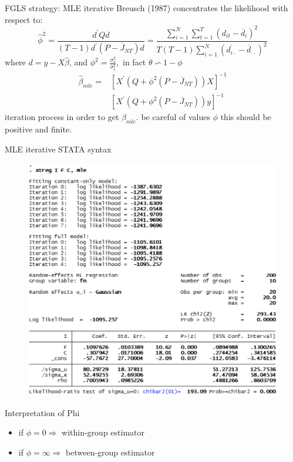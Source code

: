 \begin{frame}{FGLS strategy: MLE iterative}	
	Breusch (1987) concentrates the likelihood with respect to:%
			$$\widehat{\phi }^{2}=\frac{d^{\prime }Qd}{\left( T-1\right) d^{\prime }\left(
				P-\overline{J}_{NT}\right) d}=\frac{\sum_{i=1}^{N}\sum_{t=1}^{T}\left(
				d_{it}-\overline{d}_{i}\right) ^{2}}{T\left( T-1\right) \sum_{i=1}^{N}\left( 
				\overline{d_{i\cdot }}-\overline{d}_{\cdot \cdot }\right) ^{2}}$$
	where $d=y-X\widehat{\beta }$, and $\phi ^{2}=\frac{\sigma _{\nu }^{2}}{\sigma _{1}^{2}},$ in fact $\theta \backsim 1-\phi $
		\begin{align*}
			\widehat{\beta }_{mle} = & \left[X^{\prime}\left(Q+\phi^{2}\left(P-
									   \overline{J}_{NT}\right) \right) X\right] ^{-1} \\
									 & \left[X^{\prime}\left(Q+\phi^{2}\left(P-\overline{J}_{NT}\right)
									   \right)y\right]^{-1}
		\end{align*}
	iteration process in order to get $\widehat{\beta}_{mle}.$ be careful of values $\phi$ this should be positive and finite.
\end{frame}
\begin{frame}{MLE iterative STATA syntax}
		\begin{figure}
			\centering
			\includegraphics[width = 0.5\linewidth]{figures/panel_09.png}
		\end{figure}
\end{frame}
\begin{frame}{Interpretation of Phi}
	\begin{itemize}
		\item if $\phi =0\Rightarrow $ within-group estimator
		\item if $\phi =\infty \Rightarrow $ between-group estimator
	\end{itemize}
\end{frame}

